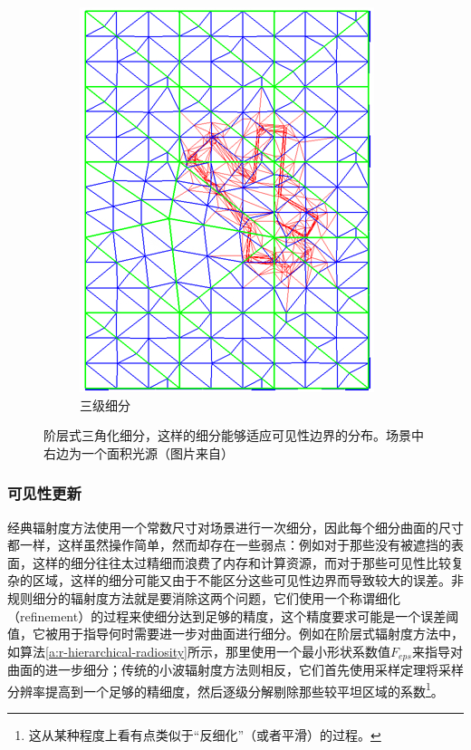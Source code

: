 \begin{figure}
\begin{fullwidth}
\begin{subfigure}[b]{0.245\thewidth}
		\includegraphics[width=1.\textwidth]{figures/r/hierarchical-triangulation-4}
		\caption{三级细分}
	\end{subfigure}
	\caption{阶层式三角化细分，这样的细分能够适应可见性边界的分布。场景中右边为一个面积光源（图片来自\cite{a:FastandAccurateHierarchicalRadiosityUsingGlobalVisibility}）}
	\label{f:r-hierarchical-triangulation}
\end{fullwidth}
\end{figure}




\subsubsection{可见性更新}
经典辐射度方法使用一个常数尺寸对场景进行一次细分，因此每个细分曲面的尺寸都一样，这样虽然操作简单，然而却存在一些弱点：例如对于那些没有被遮挡的表面，这样的细分往往太过精细而浪费了内存和计算资源，而对于那些可见性比较复杂的区域，这样的细分可能又由于不能区分这些可见性边界而导致较大的误差。非规则细分的辐射度方法就是要消除这两个问题，它们使用一个称谓细化（refinement）的过程来使细分达到足够的精度，这个精度要求可能是一个误差阈值，它被用于指导何时需要进一步对曲面进行细分。例如在阶层式辐射度方法中，如算法\ref{a:r-hierarchical-radiosity}所示，那里使用一个最小形状系数值$F_{eps}$来指导对曲面的进一步细分；传统的小波辐射度方法则相反，它们首先使用采样定理将采样分辨率提高到一个足够的精细度，然后逐级分解剔除那些较平坦区域的系数\footnote{这从某种程度上看有点类似于“反细化”（或者平滑）的过程。}。

